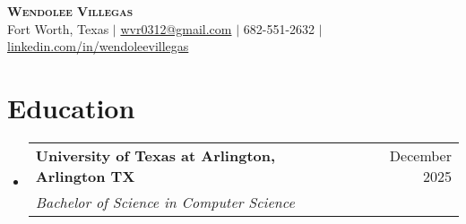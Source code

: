 \documentclass[letterpaper,11pt]{article}
\makeatletter
\newcommand{\resumeItem}[1]{
  \item\small{
    {#1 \vspace{-2pt}}
  }
}
\newcommand{\resumeSubheading}[4]{
  \vspace{-2pt}\item
    \begin{tabular*}{0.97\textwidth}[t]{l@{\extracolsep{\fill}}r}
      \textbf{#1} & #2 \\
      \textit{\small#3} & \textit{\small #4} \\
    \end{tabular*}\vspace{-7pt}
}
\newcommand{\resumeSubHeadingListStart}{\begin{itemize}[leftmargin=0.15in, label={}]}
\newcommand{\resumeSubHeadingListEnd}{\end{itemize}}
\makeatother
\begin{document}

\begin{center}
    \textbf{\Huge \scshape Wendolee Villegas} \\ \vspace{1pt}
    \small Fort Worth, Texas $|$ \href{mailto:x@x.com}{{wvr0312@gmail.com}} $|$ \small 682-551-2632 $|$
    \href{https://www.linkedin.com/in/wendolee-villegas-565440252/}{{linkedin.com/in/wendoleevillegas}}
\end{center}


\section{Education}
  \resumeSubHeadingListStart
    \resumeSubheading
      {University of Texas at Arlington, Arlington TX}{December 2025}
      {Bachelor of Science in Computer Science}{}
  \resumeSubHeadingListEnd

\end{document}
